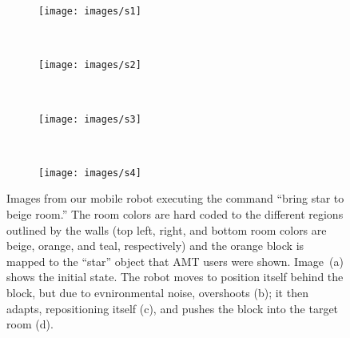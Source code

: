 \documentclass[conference]{IEEEtran}
\begin{document}
\begin{figure}
        \centering
        \begin{subfigure}[b]{0.23\textwidth}
                \texttt{[image: images/s1]}
                \caption{}
                \label{fig:real1}
        \end{subfigure}%
        ~ %
        \begin{subfigure}[b]{0.23\textwidth}
                \texttt{[image: images/s2]}
                \caption{}
                \label{fig:real2}
        \end{subfigure}
        ~ %
        \begin{subfigure}[b]{0.23\textwidth}
                \texttt{[image: images/s3]}
                \caption{}
                \label{fig:real3}
        \end{subfigure}
        ~
         \begin{subfigure}[b]{0.23\textwidth}
                \texttt{[image: images/s4]}
                \caption{}
                \label{fig:real4}
        \end{subfigure}
        \caption{\small Images from our mobile robot executing the command ``bring star to beige room.'' The room colors are hard coded to the different regions outlined by the walls (top left, right, and bottom room colors are beige, orange, and teal, respectively) and the orange block is mapped to the ``star'' object that AMT users were shown. Image~(a) shows the initial state. 
        The robot moves to position itself behind the block, but due to evnironmental noise, overshoots (b); it then adapts, repositioning itself (c), and pushes the block into the target room (d).}
        \label{fig:real}
\end{figure}
\end{document}
